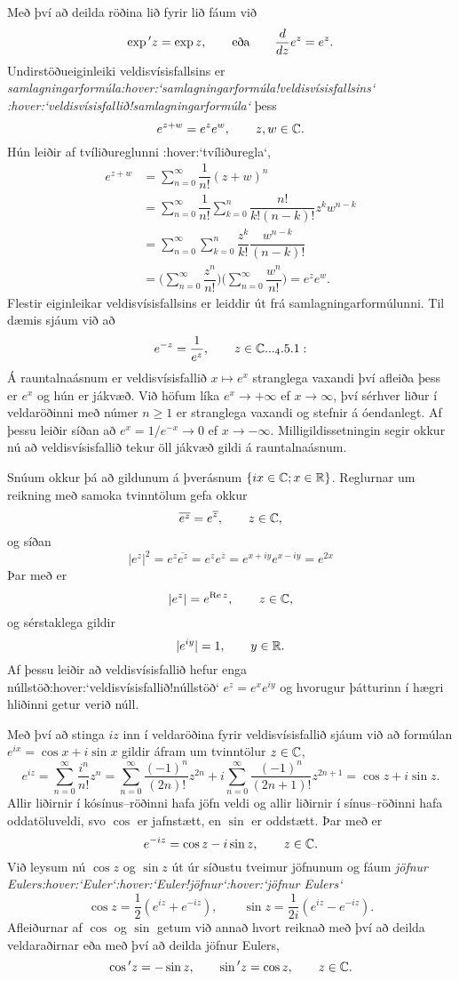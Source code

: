 Með því að
deilda röðina lið fyrir lið fáum við 
 $$\exp{\sp{\prime}} z=\exp z, \qquad \text{eða} \qquad \dfrac d{dz}e^z=e^z.
 $$
Undirstöðueiginleiki veldisvísisfallsins er {\it
samlagningarformúla:hover:`samlagningarformúla!veldisvísisfallsins`
:hover:`veldisvísisfallið!samlagningarformúla`} þess
$$ e^{z+w}=e^ze^w, \qquad z,w\in {\mathbb C}. $$
Hún leiðir af tvíliðureglunni :hover:`tvíliðuregla`,
\begin{align*}
e^{z+w}&=\sum_{n=0}^\infty\dfrac 1{n!}(z+w)^n\\
&=\sum_{n=0}^\infty\dfrac 1{n!}\sum_{k=0}^n \dfrac{n!}{k!(n-k)!}z^kw^{n-k}\\
&=\sum_{n=0}^\infty\sum_{k=0}^n \dfrac {z^k}{k!}\dfrac {w^{n-k}}{(n-k)!}\\
&=\bigg(\sum_{n=0}^\infty \dfrac {z^n}{n!}\bigg)\bigg(\sum_{n=0}^\infty\dfrac
{w^{n}}{n!}\bigg)=e^ze^w. 
\end{align*}
Flestir eiginleikar veldisvísisfallsins er leiddir út frá
samlagningarformúlunni.  Til dæmis sjáum við að 
 \begin{equation*}e^{-z}=\dfrac 1{e^z}, \qquad z\in \C.

.. _4.5.1:

 \end{equation*}
Á rauntalnaásnum er veldisvísisfallið $x\mapsto e^x$
stranglega vaxandi því afleiða þess er $e^x$ og hún er jákvæð.
Við höfum líka $e^x\to+\infty$ ef
$x\to \infty$, því sérhver liður í veldaröðinni með
númer $n\geq 1$ er stranglega vaxandi og stefnir á óendanlegt. Af
þessu leiðir síðan að $e^{x}=1/e^{-x}\to 0$ ef $x\to -\infty$.
Milligildissetningin segir okkur nú að veldisvísisfallið tekur öll
jákvæð gildi á rauntalnaásnum.  



Snúum okkur þá að gildunum á  þverásnum $\{ix\in {\mathbb C};
 x\in {\mathbb R}\}$. Reglurnar um reikning með samoka tvinntölum gefa
okkur
$$\overline{e^z}=e^{\overline z},\qquad z\in {\mathbb C},
$$
og síðan
 $$|e^z|^2=e^z\overline{e^{z}}=e^ze^{\overline z}=e^{x+iy}e^{x-iy}=e^{2x}
 $$
Þar með er
 $$|e^z|=e^{{\operatorname{Re\, }} z}, \qquad z\in {\mathbb C},
 $$
og sérstaklega gildir 
$$
|e^{iy}|=1, \qquad y\in {\mathbb R}.
$$
Af þessu leiðir  að veldisvísisfallið hefur enga
núllstöð:hover:`veldisvísisfallið!núllstöð`
$e^z=e^xe^{iy}$ og  hvorugur þátturinn í hægri hliðinni getur verið
núll.  

Með því að stinga $iz$ inn í veldaröðina fyrir veldis\-vísis\-fallið
sjáum við að formúlan $e^{ix}=\cos x+i\sin x$ gildir áfram um 
tvinntölur $z\in{\mathbb C}$,
 $$
e^{iz}=\sum\limits_{n=0}^\infty\dfrac{i^n}{n!}z^n
=\sum\limits_{n=0}^\infty\dfrac{(-1)^n}{(2n)!}z^{2n}
+i\sum\limits_{n=0}^\infty\dfrac{(-1)^n}{(2n+1)!}z^{2n+1}
=\cos z +i \sin z.
 $$
Allir liðirnir í kósínus--röðinni hafa jöfn veldi og allir liðirnir í
sínus--röðinni hafa oddatöluveldi, svo $\cos$ er jafnstætt, en
$\sin$ er oddstætt.  Þar með er
 $$e^{-iz}=\cos z-i\sin z, \qquad z\in {\mathbb C}.
 $$
Við leysum nú $\cos z$ og $\sin z$ út úr síðustu tveimur
jöfnunum og fáum {\it jöfnur
Eulers:hover:`Euler`:hover:`Euler!jöfnur`:hover:`jöfnur Eulers`}
 $$\cos z =\frac 12(e^{iz}+e^{-iz}), \qquad
\sin z =\frac 1{2i}(e^{iz}-e^{-iz}).
 $$
Afleiðurnar af $\cos$ og $\sin$ getum við annað hvort reiknað með því
að deilda veldaraðirnar eða með því að deilda jöfnur Eulers,
 $$\cos{\sp{\prime}} z=-\sin z, \qquad \sin{\sp{\prime}} z=\cos z, \qquad z\in {\mathbb C}.
 $$



